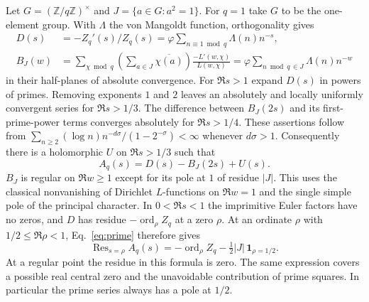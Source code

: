 \documentclass[11pt]{article}
\DeclareMathOperator*{\Res}{Res}
\newcommand{\ord}{\operatorname{ord}}
\begin{document}
Let $G=(\mathbb Z/q\mathbb Z)^\times$ and $J=\{a\in G:a^2=1\}$. For $q=1$ take $G$ to be the one-element group. With $\Lambda$ the von Mangoldt function, orthogonality gives
\begin{align*}
 D(s)&=-Z_q'(s)/Z_q(s)
       =\varphi\sum_{n\equiv1\bmod q}\Lambda(n)n^{-s},\\
 B_J(w)&=\sum_{\chi\bmod q}
      \left(\sum_{a\in J}\overline{\chi(a)}\right)
                  \frac{-L'(w,\chi)}{L(w,\chi)}
       =\varphi\sum_{n\bmod q\,\in J}\Lambda(n)n^{-w}
\end{align*}
in their half-planes of absolute convergence. For $\Re s>1$ expand $D(s)$ in powers of primes. Removing exponents $1$ and $2$ leaves an absolutely and locally uniformly convergent series for $\Re s>1/3$. The difference between $B_J(2s)$ and its first-prime-power terms converges absolutely for $\Re s>1/4$. These assertions follow from $\sum_{n\ge2}(\log n)n^{-d\sigma}/(1-2^{-\sigma})<\infty$ whenever $d\sigma>1$. Consequently there is a holomorphic $U$ on $\Re s>1/3$ such that
\begin{equation}\label{eq:prime}
 A_q(s)=D(s)-B_J(2s)+U(s).
\end{equation}
$B_J$ is regular on $\Re w\ge1$ except for its pole at $1$ of residue $|J|$. This uses the classical nonvanishing of Dirichlet $L$-functions on $\Re w=1$ and the single simple pole of the principal character. In $0<\Re s<1$ the imprimitive Euler factors have no zeros, and $D$ has residue $-\ord_\rho Z_q$ at a zero $\rho$. At an ordinate $\rho$ with $1/2\le\Re\rho<1$, Eq.~\eqref{eq:prime} therefore gives
\begin{equation}\label{eq:mult}
 \Res_{s=\rho} A_q(s)=-\ord_\rho Z_q-
               \tfrac12|J|\,\mathbf1_{\rho=1/2}.
\end{equation}
At a regular point the residue in this formula is zero. The same expression covers a possible real central zero and the unavoidable contribution of prime squares. In particular the prime series always has a pole at $1/2$.
\end{document}

